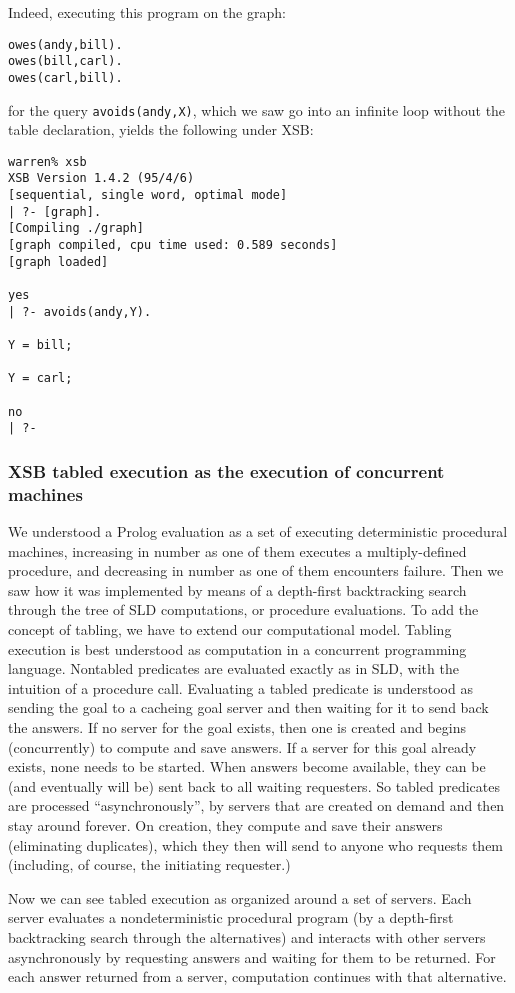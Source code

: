 Indeed, executing this program on the graph:
\begin{verbatim}
owes(andy,bill).
owes(bill,carl).
owes(carl,bill).
\end{verbatim}
for the query \verb|avoids(andy,X)|, which we saw go into an infinite
loop without the table declaration, yields the following under XSB:
\begin{verbatim}
warren% xsb
XSB Version 1.4.2 (95/4/6)
[sequential, single word, optimal mode]
| ?- [graph].
[Compiling ./graph]
[graph compiled, cpu time used: 0.589 seconds]
[graph loaded]

yes
| ?- avoids(andy,Y).

Y = bill;

Y = carl;

no
| ?- 
\end{verbatim}

\subsubsection{XSB tabled execution as the execution of concurrent machines}

We understood a Prolog evaluation as a set of executing deterministic
procedural machines, increasing in number as one of them executes a
multiply-defined procedure, and decreasing in number as one of them
encounters failure.  Then we saw how it was implemented by means of a
depth-first backtracking search through the tree of SLD computations,
or procedure evaluations.  To add the concept of tabling, we have to
extend our computational model.  Tabling execution is best understood
as computation in a concurrent programming language.  Nontabled
predicates are evaluated exactly as in SLD, with the intuition of a
procedure call.  Evaluating a tabled predicate is understood as
sending the goal to a cacheing goal server and then waiting for it to
send back the answers.  If no server for the goal exists, then one is
created and begins (concurrently) to compute and save answers.  If a
server for this goal already exists, none needs to be started.  When
answers become available, they can be (and eventually will be) sent
back to all waiting requesters.  So tabled predicates are processed
``asynchronously'', by servers that are created on demand and then
stay around forever.  On creation, they compute and save their answers
(eliminating duplicates), which they then will send to anyone who
requests them (including, of course, the initiating requester.)

Now we can see tabled execution as organized around a set of servers.
Each server evaluates a nondeterministic procedural program (by a
depth-first backtracking search through the alternatives) and
interacts with other servers asynchronously by requesting answers and
waiting for them to be returned.  For each answer returned from a
server, computation continues with that alternative.

